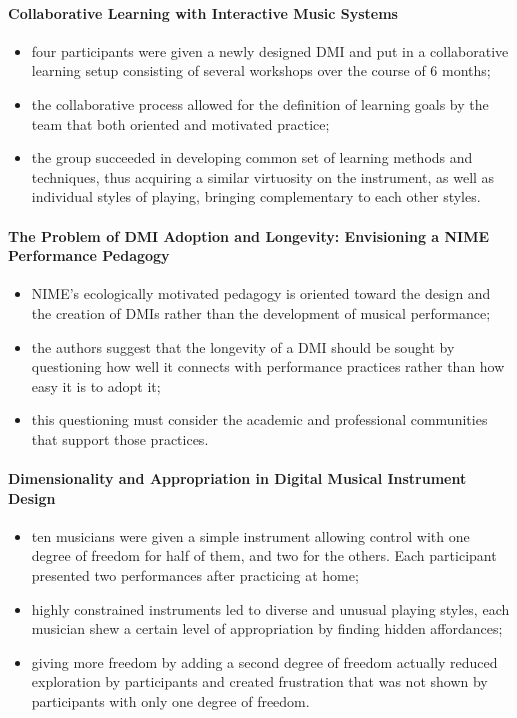 \documentclass[11pt]{article}
\begin{document}
\paragraph{Collaborative Learning with Interactive Music Systems} \citep{marquez-borbon_collaborative_2020}

\begin{itemize}
    \item four participants were given a newly designed DMI and put in a collaborative learning setup consisting of several workshops over the course of 6 months;
    \item the collaborative process allowed for the definition of learning goals by the team that both oriented and motivated practice;
    \item the group succeeded in developing common set of learning methods and techniques, thus acquiring a similar virtuosity on the instrument, as well as individual styles of playing, bringing complementary to each other styles.
\end{itemize}


\paragraph{The Problem of DMI Adoption and Longevity: Envisioning a NIME Performance Pedagogy} \citep{marquez-borbon_problem_2018}

\begin{itemize}
    \item NIME's ecologically motivated pedagogy is oriented toward the design and the creation of DMIs rather than the development of musical performance;
    \item the authors suggest that the longevity of a DMI should be sought by questioning how well it connects with performance practices rather than how easy it is to adopt it;
    \item this questioning must consider the academic and professional communities that support those practices.
\end{itemize}

\paragraph{Dimensionality and Appropriation in Digital Musical Instrument Design} \citep{zappi_dimensionality_2014}

\begin{itemize}
    \item ten musicians were given a simple instrument allowing control with one degree of freedom for half of them, and two for the others. Each participant presented two performances after practicing at home;
    \item highly constrained instruments led to diverse and unusual playing styles, each musician shew a certain level of appropriation by finding hidden affordances;
    \item giving more freedom by adding a second degree of freedom actually reduced exploration by participants and created frustration that was not shown by participants with only one degree of freedom.
\end{itemize}
\end{document}
